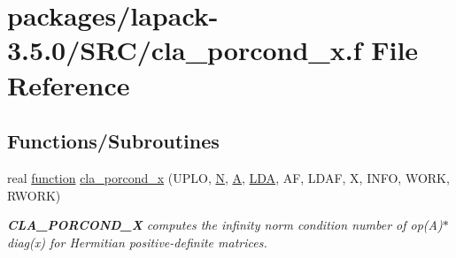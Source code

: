 \hypertarget{cla__porcond__x_8f}{}\section{packages/lapack-\/3.5.0/\+S\+R\+C/cla\+\_\+porcond\+\_\+x.f File Reference}
\label{cla__porcond__x_8f}
\subsection*{Functions/\+Subroutines}
\begin{DoxyCompactItemize}
\item 
real \hyperlink{afunc_8m_a7b5e596df91eadea6c537c0825e894a7}{function} \hyperlink{group__complexPOcomputational_gaae09867c151f12f346831c649a0c8e14}{cla\+\_\+porcond\+\_\+x} (U\+P\+L\+O, \hyperlink{polmisc_8c_a0240ac851181b84ac374872dc5434ee4}{N}, \hyperlink{classA}{A}, \hyperlink{example__user_8c_ae946da542ce0db94dced19b2ecefd1aa}{L\+D\+A}, A\+F, L\+D\+A\+F, X, I\+N\+F\+O, W\+O\+R\+K, R\+W\+O\+R\+K)
\begin{DoxyCompactList}\small\item\em {\bfseries C\+L\+A\+\_\+\+P\+O\+R\+C\+O\+N\+D\+\_\+\+X} computes the infinity norm condition number of op(\+A)$\ast$diag(x) for Hermitian positive-\/definite matrices. \end{DoxyCompactList}\end{DoxyCompactItemize}
